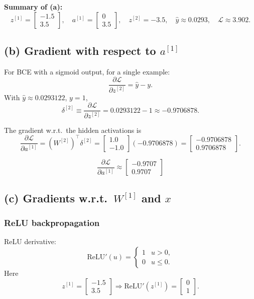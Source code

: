 \documentclass{article}
\begin{document}
\noindent
\textbf{Summary of (a):}
\[
z^{[1]} =
\begin{bmatrix}
-1.5\\
3.5
\end{bmatrix},\quad
a^{[1]} =
\begin{bmatrix}
0\\
3.5
\end{bmatrix},\quad
z^{[2]} = -3.5,\quad
\hat y \approx 0.0293,\quad
\mathcal{L} \approx 3.902.
\]

\subsection{(b) Gradient with respect to $a^{[1]}$}

For BCE with a sigmoid output, for a single example:
\[
\frac{\partial\mathcal{L}}{\partial z^{[2]}} = \hat y - y.
\]
With $\hat y \approx 0.0293122$, $y=1$,
\[
\delta^{[2]} \equiv \frac{\partial\mathcal{L}}{\partial z^{[2]}}
= 0.0293122 - 1 \approx -0.9706878.
\]

The gradient w.r.t.\ the hidden activations is
\[
\frac{\partial\mathcal{L}}{\partial a^{[1]}}
= (W^{[2]})^\top \delta^{[2]}
=
\begin{bmatrix}
1.0\\
-1.0
\end{bmatrix}
(-0.9706878)
=
\begin{bmatrix}
-0.9706878\\
0.9706878
\end{bmatrix}.
\]

\[
\boxed{
	\frac{\partial\mathcal{L}}{\partial a^{[1]}}
	\approx
	\begin{bmatrix}
	-0.9707\\
	0.9707
	\end{bmatrix}
}
\]

\subsection{(c) Gradients w.r.t.\ $W^{[1]}$ and $x$}

\subsubsection*{ReLU backpropagation}

ReLU derivative:
\[
\mathrm{ReLU}'(u) =
\begin{cases}
1 & u > 0,\\
0 & u \le 0.
\end{cases}
\]
Here
\[
z^{[1]} =
\begin{bmatrix}
-1.5\\
3.5
\end{bmatrix}
\Rightarrow
\mathrm{ReLU}'(z^{[1]}) =
\begin{bmatrix}
0\\
1
\end{bmatrix}.
\]
\end{document}
